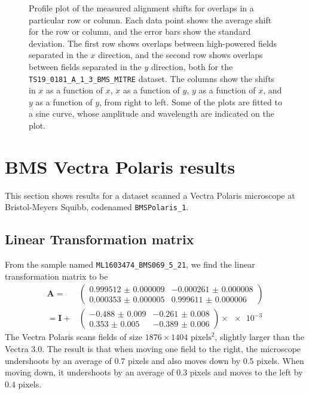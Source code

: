 \documentclass{article}
\newcommand{\matrixbold}[1]{\mathbf{#1}}
\begin{document}
\begin{figure}[ht]
\begin{subfigure}{0.24\linewidth}
		\caption{}
		\label{fig:sinewave4yyJHUPolaris}
	\end{subfigure}
	\caption{Profile plot of the measured alignment shifts for overlaps in a particular row or column.  Each data point shows the average shift for the row or column, and the error bars show the standard deviation.  The first row shows overlaps between high-powered fields separated in the $x$ direction, and the second row shows overlaps between fields separated in the $y$ direction, both for the \texttt{TS19\_0181\_A\_1\_3\_BMS\_MITRE} dataset.  The columns show the shifts in $x$ as a function of $x$, $x$ as a function of $y$, $y$ as a function of $x$, and $y$ as a function of $y$, from right to left.  Some of the plots are fitted to a sine curve, whose amplitude and wavelength are indicated on the plot.}
	\label{fig:sinewavesJHUPolaris}
\end{figure}

\clearpage

\fi

\section{BMS Vectra Polaris results}

This section shows results for a dataset scanned a Vectra Polaris microscope at Bristol-Meyers Squibb, codenamed \texttt{BMSPolaris\_1}.

\subsection{Linear Transformation matrix}

From the sample named \texttt{ML1603474\_BMS069\_5\_21}, we find the linear transformation matrix to be
\begin{align}
\matrixbold{A}=&\begin{pmatrix}
\num{0.999512(9)} &
\num{-0.000261(8)} \\
\num{0.000353(5)} &
\num{0.999611(6)}
\end{pmatrix} \\
=\matrixbold{I} + &\begin{pmatrix}
\num{-0.488(9)} &
\num{-0.261(8)} \\
\num{0.353(5)} &
\num{-0.389(6)}
\end{pmatrix} \times \num{e-3}
\label{eq:Amatrix_ML1603474_BMS069_5_21}
\end{align}
The Vectra Polaris scans fields of size $1876\times1404$ $\text{pixels}^2$, slightly larger than the Vectra 3.0.  The result is that when moving one field to the right, the microscope undershoots by an average of $0.7$ pixels and also moves down by $0.5$ pixels.  When moving down, it undershoots by an average of $0.3$ pixels and moves to the left by $0.4$ pixels.
\end{document}

